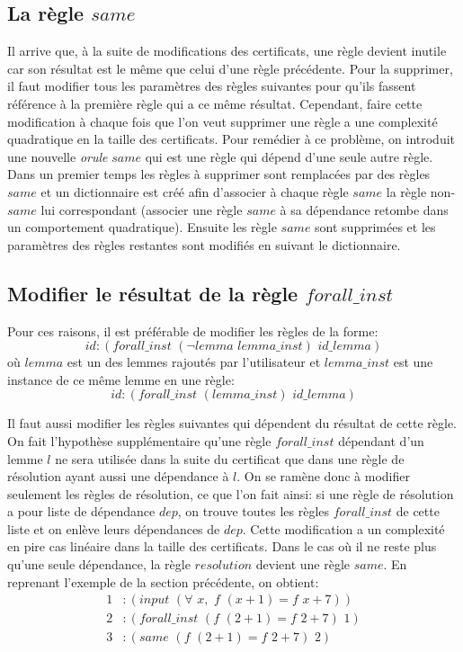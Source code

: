 \documentclass[11pt]{article}
\begin{document}
\subsection{La règle $same$}

Il arrive que, à la suite de modifications des certificats, une règle devient inutile car son résultat est le même que celui d'une règle précédente. Pour la supprimer, il faut modifier tous les paramètres des règles suivantes pour qu'ils fassent référence à la première règle qui a ce même résultat. Cependant, faire cette modification à chaque fois que l'on veut supprimer une règle a une complexité quadratique en la taille des certificats. Pour remédier à ce problème, on introduit une nouvelle \textit{orule} $same$ qui est une règle qui dépend d'une seule autre règle. Dans un premier temps les règles à supprimer sont remplacées par des règles $same$ et un dictionnaire est créé afin d'associer à chaque règle $same$ la règle non-$same$ lui correspondant (associer une règle $same$ à sa dépendance retombe dans un comportement quadratique). Ensuite les règle $same$ sont supprimées et les paramètres des règles restantes sont modifiés en suivant le dictionnaire.

\subsection{Modifier le résultat de la règle $forall\_inst$} \label{processing_forallinst}

Pour ces raisons, il est préférable de modifier les règles de la forme:
\[id:(forall\_inst \,\,(\neg lemma \,\, lemma\_inst) \,\,id\_lemma)\]
où $lemma$ est un des lemmes rajoutés par l'utilisateur et $lemma\_inst$ est une instance de ce même lemme en une règle:
\[id:(forall\_inst \,\,(lemma\_inst) \,\, id\_lemma)\]

Il faut aussi modifier les règles suivantes qui dépendent du résultat de cette règle. On fait l'hypothèse supplémentaire qu'une règle $forall\_inst$ dépendant d'un lemme $l$ ne sera utilisée dans la suite du certificat que dans une règle de résolution ayant aussi une dépendance à $l$. On se ramène donc à modifier seulement les règles de résolution, ce que l'on fait ainsi: si une règle de résolution a pour liste de dépendance $dep$, on trouve toutes les règles $forall\_inst$ de cette liste et on enlève leurs dépendances de $dep$. Cette modification a un complexité en pire cas linéaire dans la taille des certificats. Dans le cas où il ne reste plus qu'une seule dépendance, la règle $resolution$ devient une règle $same$. En reprenant l'exemple de la section précédente, on obtient: 
\begin{align*}
1&:(input\,\, (\forall \,\,x, \,\, f \,\,(x+1) = f\,\,x + 7)) \\
2&:(forall\_inst \,\,(f\,\, (2+1) = f\,\,2 + 7) \,\,1) \\
3&:(same\,\, (f\,\,(2+1) = f\,\,2 + 7) \,\,2) 
\end{align*}
\end{document}

